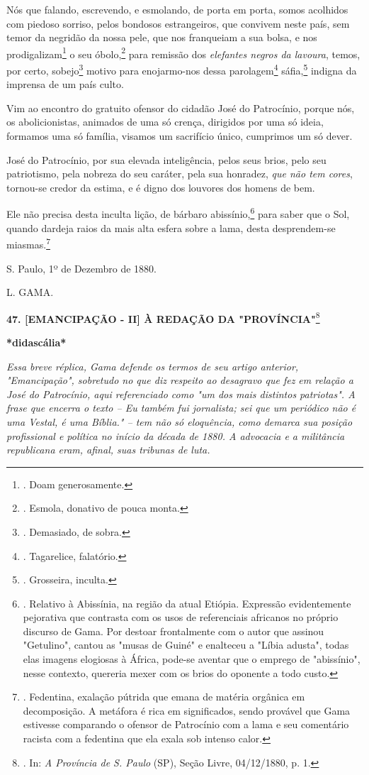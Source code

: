Nós que falando, escrevendo, e esmolando, de porta em porta, somos
acolhidos com piedoso sorriso, pelos bondosos estrangeiros, que convivem
neste país, sem temor da negridão da nossa pele, que nos franqueiam a
sua bolsa, e nos prodigalizam\footnote{. Doam generosamente.} o seu
óbolo,\footnote{. Esmola, donativo de pouca monta.} para remissão dos
\emph{elefantes negros da lavoura}, temos, por certo, sobejo\footnote{.
  Demasiado, de sobra.} motivo para enojarmo-nos dessa
parolagem\footnote{. Tagarelice, falatório.} sáfia,\footnote{.
  Grosseira, inculta.} indigna da imprensa de um país culto.

Vim ao encontro do gratuito ofensor do cidadão José do Patrocínio,
porque nós, os abolicionistas, animados de uma só crença, dirigidos por
uma só ideia, formamos uma só família, visamos um sacrifício único,
cumprimos um só dever.

José do Patrocínio, por sua elevada inteligência, pelos seus brios, pelo
seu patriotismo, pela nobreza do seu caráter, pela sua honradez,
\emph{que não tem cores}, tornou-se credor da estima, e é digno dos
louvores dos homens de bem.

Ele não precisa desta inculta lição, de bárbaro abissínio,\footnote{.
  Relativo à Abissínia, na região da atual Etiópia. Expressão
  evidentemente pejorativa que contrasta com os usos de referenciais
  africanos no próprio discurso de Gama. Por destoar frontalmente com o
  autor que assinou "Getulino", cantou as "musas de Guiné" e enalteceu a
  "Líbia adusta", todas elas imagens elogiosas à África, pode-se aventar
  que o emprego de "abissínio", nesse contexto, quereria mexer com os
  brios do oponente a todo custo.} para saber que o Sol, quando dardeja
raios da mais alta esfera sobre a lama, desta desprendem-se
miasmas.\footnote{. Fedentina, exalação pútrida que emana de matéria
  orgânica em decomposição. A metáfora é rica em significados, sendo
  provável que Gama estivesse comparando o ofensor de Patrocínio com a
  lama e seu comentário racista com a fedentina que ela exala sob
  intenso calor.}

S. Paulo, 1º de Dezembro de 1880.

L. GAMA.

\textbf{47. {[}EMANCIPAÇÃO - II{]} À REDAÇÃO DA "PROVÍNCIA"}\footnote{.
  In: \emph{A Província de S. Paulo} (SP), Seção Livre, 04/12/1880, p.
  1.}

\textbf{*didascália*}

\emph{Essa breve réplica, Gama defende os termos de seu artigo anterior,
"Emancipação", sobretudo no que diz respeito ao desagravo que fez em
relação a José do Patrocínio, aqui referenciado como "um dos mais
distintos patriotas". A frase que encerra o texto -- Eu também fui
jornalista; sei que um periódico não é uma Vestal, é uma Bíblia." -- tem
não só eloquência, como demarca sua posição profissional e política no
início da década de 1880. A advocacia e a militância republicana eram,
afinal, suas tribunas de luta.}

